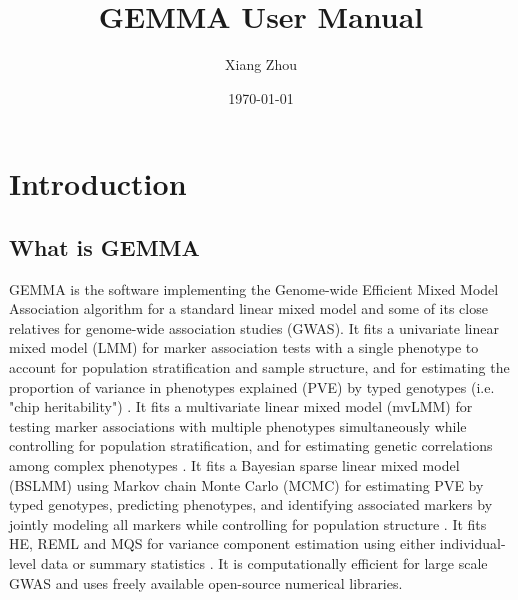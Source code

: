 \documentclass[11pt]{article}
\title{GEMMA User Manual}
\author{Xiang Zhou}
\date{\today}
\begin{document}
\maketitle

\tableofcontents

\newpage

\section{Introduction}

\subsection{What is GEMMA}

GEMMA is the software implementing the Genome-wide Efficient Mixed
Model Association algorithm \cite{Zhou:2012} for a standard linear
mixed model and some of its close relatives for genome-wide
association studies (GWAS). It fits a univariate linear mixed model
(LMM) for marker association tests with a single phenotype to account
for population stratification and sample structure, and for estimating
the proportion of variance in phenotypes explained (PVE) by typed
genotypes (i.e. "chip heritability") \cite{Zhou:2012}. It fits a
multivariate linear mixed model (mvLMM) for testing marker
associations with multiple phenotypes simultaneously while controlling
for population stratification, and for estimating genetic correlations
among complex phenotypes \cite{Zhou:2014}. It fits a Bayesian sparse
linear mixed model (BSLMM) using Markov chain Monte Carlo (MCMC) for
estimating PVE by typed genotypes, predicting phenotypes, and
identifying associated markers by jointly modeling all markers while
controlling for population structure \cite{Zhou:2013}. It fits HE,
REML and MQS for variance component estimation using either
individual-level data or summary statistics \cite{Zhou:2016}. It is
computationally efficient for large scale GWAS and uses freely
available open-source numerical libraries.
\end{document}
